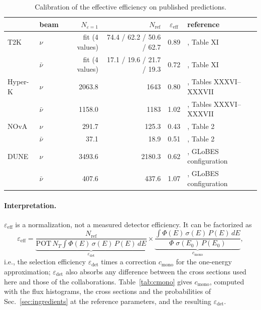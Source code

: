 \documentclass[11pt,a4paper]{article}
\newcommand{\POT}{\mathrm{POT}}
\begin{document}
\begin{table}[ht]
\centering
\caption{Calibration of the effective efficiency on published predictions.}
\label{tab:ref}
\small
\begin{tabular}{llrrcl}
\toprule
 & beam & $N_{\varepsilon=1}$ & $N_\text{ref}$ & $\varepsilon_\text{eff}$ & reference \\
\midrule
T2K     & $\nu$     & fit (4 values) & 74.4 / 62.2 / 50.6 / 62.7 & 0.89 & \cite{T2K:2021xwb}, Table XI \\
        & $\bar\nu$ & fit (4 values) & 17.1 / 19.6 / 21.7 / 19.3 & 0.72 & \cite{T2K:2021xwb}, Table XI \\
Hyper-K & $\nu$     & 2063.8 & 1643   & 0.80 & \cite{Hyper-Kamiokande:2018ofw}, Tables XXXVI--XXXVII \\
        & $\bar\nu$ & 1158.0 & 1183   & 1.02 & \cite{Hyper-Kamiokande:2018ofw}, Tables XXXVI--XXXVII \\
NOvA    & $\nu$     & 291.7  & 125.3  & 0.43 & \cite{NOvA:2025tmb}, Table 2 \\
        & $\bar\nu$ & 37.1   & 18.9   & 0.51 & \cite{NOvA:2025tmb}, Table 2 \\
DUNE    & $\nu$     & 3493.6 & 2180.3 & 0.62 & \cite{DUNE:2021cuw}, GLoBES configuration \\
        & $\bar\nu$ & 407.6  & 437.6  & 1.07 & \cite{DUNE:2021cuw}, GLoBES configuration \\
\bottomrule
\end{tabular}
\end{table}

\paragraph{Interpretation.} $\varepsilon_\text{eff}$ is a normalization, not a measured detector efficiency.
It can be factorized as
\begin{equation}
  \varepsilon_\text{eff} =
  \underbrace{\frac{N_\text{ref}}{\POT\,N_T\int\Phi(E)\,\sigma(E)\,P(E)\,dE}}_{\varepsilon_\text{det}}
  \times
  \underbrace{\frac{\int\Phi(E)\,\sigma(E)\,P(E)\,dE}{\Phi\;\sigma(E_0)\,P(E_0)}}_{c_\text{mono}} ,
\end{equation}
i.e., the selection efficiency $\varepsilon_\text{det}$ times a correction $c_\text{mono}$ for the one-energy
approximation; $\varepsilon_\text{det}$ also absorbs any difference between the cross sections used here and those of
the collaborations. Table~\ref{tab:cmono} gives $c_\text{mono}$, computed with the flux histograms, the cross sections and
the probabilities of Sec.~\ref{sec:ingredients} at the reference parameters, and the resulting $\varepsilon_\text{det}$.
\end{document}
